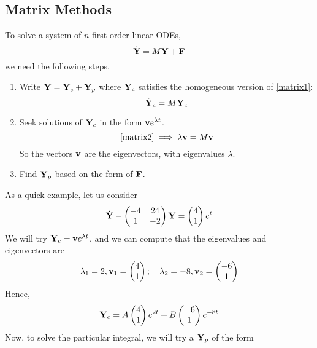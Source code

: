 \documentclass{article}
\begin{document}
\subsection{Matrix Methods}
To solve a system of $n$ first-order linear ODEs,
\begin{equation}\label{matrix1}
	\dot {\vb Y} = M\vb Y + \vb F
\end{equation}
we need the following steps.
\begin{enumerate}
	\item Write $\vb Y = \vb Y_c + \vb Y_p$ where $\vb Y_c$ satisfies the homogeneous version of \eqref{matrix1}:
	      \begin{equation}\label{matrix2}
		      \dot {\vb Y}_c = M\vb Y_c
	      \end{equation}
	\item Seek solutions of $\vb Y_c$ in the form $\vb v e^{\lambda t}$.
	      \[ \eqref{matrix2} \implies \lambda \vb v = M\vb v \]
	      So the vectors $\vb v$ are the eigenvectors, with eigenvalues $\lambda$.
	\item Find $\vb Y_p$ based on the form of $\vb F$.
\end{enumerate}
As a quick example, let us consider
\begin{equation}\label{matrixexample}
	\dot {\vb Y} - \begin{pmatrix}
		-4 & 24 \\ 1 & -2
	\end{pmatrix}\vb Y = \begin{pmatrix}
		4 \\ 1
	\end{pmatrix}e^t
\end{equation}
We will try $\vb Y_c = \vb v e^{\lambda t}$, and we can compute that the eigenvalues and eigenvectors are
\[ \lambda_1 = 2, \vb v_1 = \begin{pmatrix}
		4 \\ 1
	\end{pmatrix};\quad \lambda_2 = -8, \vb v_2 = \begin{pmatrix}
		-6 \\ 1
	\end{pmatrix} \]
Hence,
\[ \vb Y_c = A\begin{pmatrix}
		4 \\ 1
	\end{pmatrix}e^{2t} + B\begin{pmatrix}
		-6 \\ 1
	\end{pmatrix}e^{-8t} \]
Now, to solve the particular integral, we will try a $\vb Y_p$ of the form
\end{document}
